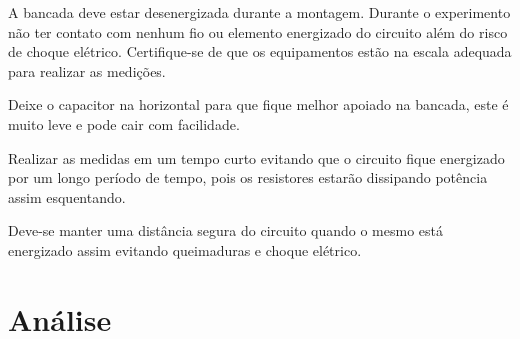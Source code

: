 \documentclass[a4paper, 12pt]{article}
\begin{document}
		A bancada deve estar desenergizada durante a montagem. Durante o experimento não ter contato com nenhum fio ou elemento energizado do circuito além do risco de choque elétrico. Certifique-se de que os equipamentos estão na escala adequada para realizar as medições.

		Deixe o capacitor na horizontal para que
		fique melhor apoiado na bancada, este é muito leve e pode cair com facilidade.

		Realizar as medidas em um tempo curto evitando que o circuito fique energizado por um longo período de tempo, pois os resistores estarão dissipando potência assim esquentando.

		Deve-se manter uma distância segura do circuito quando o mesmo está energizado assim evitando queimaduras e choque elétrico.

		\newpage
		\section{Análise}
		\justifying
\end{document}

